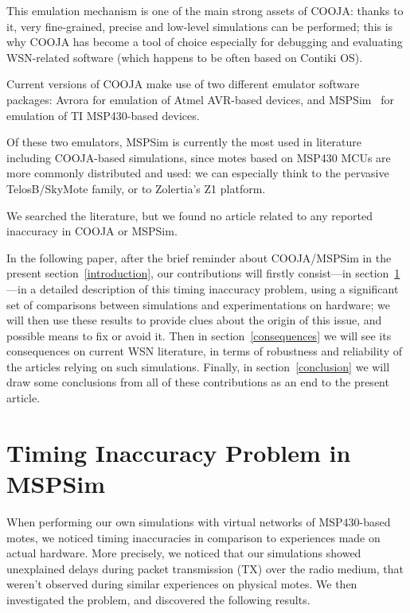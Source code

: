 \documentclass[10pt,final,journal,twocolumn]{IEEEtran}
\begin{document}
This emulation mechanism is one of the main strong assets of COOJA:
thanks to it, very fine-grained, precise and low-level simulations
can be performed; this is why COOJA has become a tool of choice especially
for debugging and evaluating WSN-related software (which happens to be
often based on Contiki OS).

Current versions of COOJA make use of two different emulator software
packages: Avrora for emulation of Atmel AVR-based devices, and
MSPSim~\cite{MSPSim} for emulation of TI MSP430-based devices.

Of these two emulators, MSPSim is currently the most used in literature
including COOJA-based simulations, since motes based on MSP430 MCUs are
more commonly distributed and used: we can especially think to the pervasive
TelosB/SkyMote family, or to Zolertia's Z1 platform.

We searched the literature, but we found no article related to any reported
inaccuracy in COOJA or MSPSim.

In the following paper, after the brief reminder about COOJA/MSPSim in the
present section~\ref{introduction}, our contributions will firstly
consist---in section~\ref{results}---in a detailed description of this
timing inaccuracy problem, using a significant set of comparisons between
simulations and experimentations on hardware; we will then use these results
to provide clues about the origin of this issue, and possible means to fix
or avoid it.
Then in section~\ref{consequences} we will see its consequences on current
WSN literature, in terms of robustness and reliability of the articles
relying on such simulations. Finally, in section~\ref{conclusion}
we will draw some conclusions from all of these contributions as an end
to the present article.



\section{Timing Inaccuracy Problem in MSPSim}
\label{results}

When performing our own simulations with virtual networks of MSP430-based
motes, we noticed timing inaccuracies in comparison to experiences made
on actual hardware. More precisely, we noticed that our simulations showed
unexplained delays during packet transmission (TX) over the radio medium,
that weren't observed during similar experiences on physical motes.
We then investigated the problem, and discovered the following results.
\end{document}
